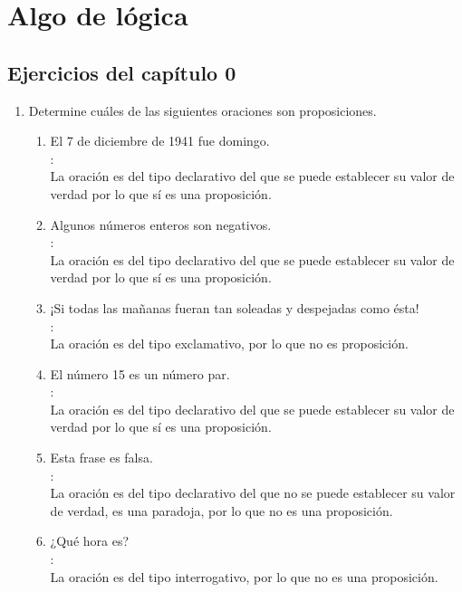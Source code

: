 \chapter{Algo de lógica}

\setcounter{section}{3}
\section{Ejercicios del capítulo 0}

\begin{enumerate}[label=0.1.\arabic*]
	\item Determine cuáles de las siguientes oraciones son proposiciones.
	\begin{enumerate}[label=\arabic*)]
		\item El 7 de diciembre de 1941 fue domingo. \\
		\solucion: \\
		La oración es del tipo declarativo del que se puede establecer su valor de verdad por lo que sí es una proposición.
		
		\item Algunos números enteros son negativos. \\
		\solucion: \\
		La oración es del tipo declarativo del que se puede establecer su valor de verdad por lo que sí es una proposición.
		
		\item ¡Si todas las mañanas fueran tan soleadas y despejadas como ésta! \\
		\solucion: \\
		La oración es del tipo exclamativo, por lo que no es proposición.
		
		\item El número 15 es un número par. \\
		\solucion: \\
		La oración es del tipo declarativo del que se puede establecer su valor de verdad por lo que sí es una proposición.
		
		\item Esta frase es falsa. \\
		\solucion: \\
		La oración es del tipo declarativo del que no se puede establecer su valor de verdad, es una paradoja, por lo que no es una proposición.
		
		\item ¿Qué hora es? \\
		\solucion: \\
		La oración es del tipo interrogativo, por lo que no es una proposición.
		

\end{enumerate}
\end{enumerate}
